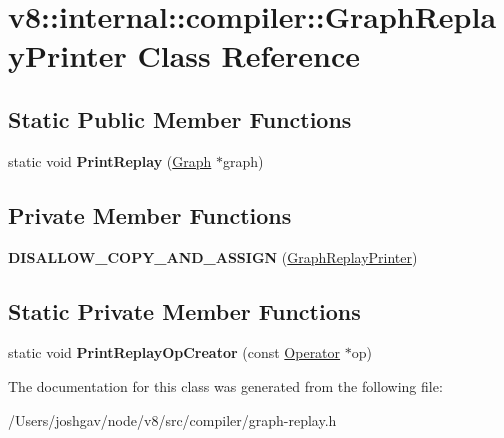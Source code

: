 \hypertarget{classv8_1_1internal_1_1compiler_1_1_graph_replay_printer}{}\section{v8\+:\+:internal\+:\+:compiler\+:\+:Graph\+Replay\+Printer Class Reference}
\label{classv8_1_1internal_1_1compiler_1_1_graph_replay_printer}
\subsection*{Static Public Member Functions}
\begin{DoxyCompactItemize}
\item 
static void {\bfseries Print\+Replay} (\hyperlink{classv8_1_1internal_1_1compiler_1_1_graph}{Graph} $\ast$graph)\hypertarget{classv8_1_1internal_1_1compiler_1_1_graph_replay_printer_ad70c8a2b9d333a4baf89f110050f0c1b}{}\label{classv8_1_1internal_1_1compiler_1_1_graph_replay_printer_ad70c8a2b9d333a4baf89f110050f0c1b}

\end{DoxyCompactItemize}
\subsection*{Private Member Functions}
\begin{DoxyCompactItemize}
\item 
{\bfseries D\+I\+S\+A\+L\+L\+O\+W\+\_\+\+C\+O\+P\+Y\+\_\+\+A\+N\+D\+\_\+\+A\+S\+S\+I\+GN} (\hyperlink{classv8_1_1internal_1_1compiler_1_1_graph_replay_printer}{Graph\+Replay\+Printer})\hypertarget{classv8_1_1internal_1_1compiler_1_1_graph_replay_printer_a730b443fa6c32e84cd90d58bb550ab4a}{}\label{classv8_1_1internal_1_1compiler_1_1_graph_replay_printer_a730b443fa6c32e84cd90d58bb550ab4a}

\end{DoxyCompactItemize}
\subsection*{Static Private Member Functions}
\begin{DoxyCompactItemize}
\item 
static void {\bfseries Print\+Replay\+Op\+Creator} (const \hyperlink{classv8_1_1internal_1_1compiler_1_1_operator}{Operator} $\ast$op)\hypertarget{classv8_1_1internal_1_1compiler_1_1_graph_replay_printer_a1dfd3dc7a08377d6cf9013d8be7adc45}{}\label{classv8_1_1internal_1_1compiler_1_1_graph_replay_printer_a1dfd3dc7a08377d6cf9013d8be7adc45}

\end{DoxyCompactItemize}


The documentation for this class was generated from the following file\+:\begin{DoxyCompactItemize}
\item 
/\+Users/joshgav/node/v8/src/compiler/graph-\/replay.\+h\end{DoxyCompactItemize}
